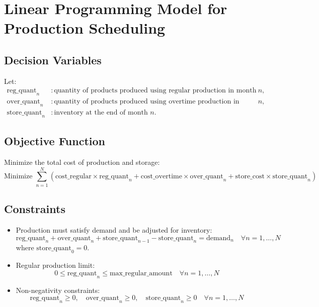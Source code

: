 \documentclass{article}
\begin{document}
\section*{Linear Programming Model for Production Scheduling}

\subsection*{Decision Variables}

Let:
\begin{align*}
    \text{reg\_quant}_n & : \text{quantity of products produced using regular production in month } n, \\
    \text{over\_quant}_n & : \text{quantity of products produced using overtime production in month } n, \\
    \text{store\_quant}_n & : \text{inventory at the end of month } n.
\end{align*}

\subsection*{Objective Function}

Minimize the total cost of production and storage:
\[
\text{Minimize } \sum_{n=1}^{N} \left( \text{cost\_regular} \times \text{reg\_quant}_n + \text{cost\_overtime} \times \text{over\_quant}_n + \text{store\_cost} \times \text{store\_quant}_n \right)
\]

\subsection*{Constraints}

\begin{itemize}
    \item Production must satisfy demand and be adjusted for inventory:
    \[
    \text{reg\_quant}_n + \text{over\_quant}_n + \text{store\_quant}_{n-1} - \text{store\_quant}_n = \text{demand}_n \quad \forall n = 1, \ldots, N
    \]
    where \( \text{store\_quant}_0 = 0 \).

    \item Regular production limit:
    \[
    0 \leq \text{reg\_quant}_n \leq \text{max\_regular\_amount} \quad \forall n = 1, \ldots, N
    \]

    \item Non-negativity constraints:
    \[
    \text{reg\_quant}_n \geq 0, \quad \text{over\_quant}_n \geq 0, \quad \text{store\_quant}_n \geq 0 \quad \forall n = 1, \ldots, N
    \]
\end{itemize}
\end{document}

